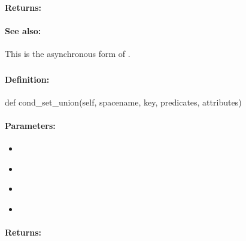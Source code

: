 \paragraph{Returns:}


\paragraph{See also:}  This is the asynchronous form of .

\pagebreak
\subsubsection{}
\label{api:python:cond_set_union}


\paragraph{Definition:}
\begin{pythoncode}
def cond_set_union(self, spacename, key, predicates, attributes)
\end{pythoncode}

\paragraph{Parameters:}
\begin{itemize}[noitemsep]
\item {}\\

\item {}\\

\item {}\\

\item {}\\

\end{itemize}

\paragraph{Returns:}


